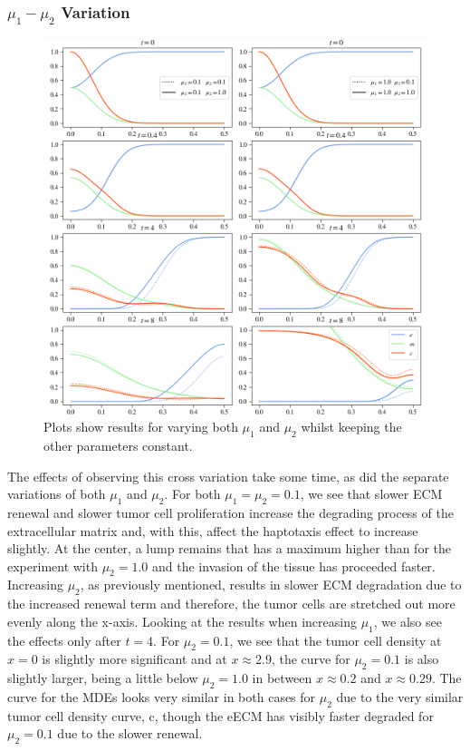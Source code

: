 \subsubsection*{$\mu_1 - \mu_2$ Variation}
\begin{figure}[h!]
    \centering
    \includegraphics[width=\textwidth]{resources/images/prolif_mu_1_mu_2_variation.png}
    \caption{Plots show results for varying both $\mu_1$ and $\mu_2$ whilst keeping the other parameters constant.}
    \label{fig:prolif_mu_1_mu_2_variation}
\end{figure}
The effects of observing this cross variation take some time, as did the separate variations of both $\mu_1$ and $\mu_2$. For both $\mu_1=\mu_2=0.1$, we see that slower ECM renewal and slower tumor cell proliferation increase the degrading process of the extracellular matrix and, with this, affect the haptotaxis effect to increase slightly. At the center, a lump remains that has a maximum higher than for the experiment with $\mu_2=1.0$ and the invasion of the tissue has proceeded faster. Increasing $\mu_2$, as previously mentioned, results in slower ECM degradation due to the increased renewal term and therefore, the tumor cells are stretched out more evenly along the x-axis. Looking at the results when increasing $\mu_1$, we also see the effects only after $t=4$. For $\mu_2=0.1$, we see that the tumor cell density at $x=0$ is slightly more significant and at $x\approx 2.9$, the curve for $\mu_2=0.1$ is also slightly larger, being a little below $\mu_2=1.0$ in between $x\approx 0.2$ and $x\approx 0.29$. The curve for the MDEs looks very similar in both cases for $\mu_2$ due to the very similar tumor cell density curve, c, though the eECM has visibly faster degraded for $\mu_2=0.1$ due to the slower renewal.

